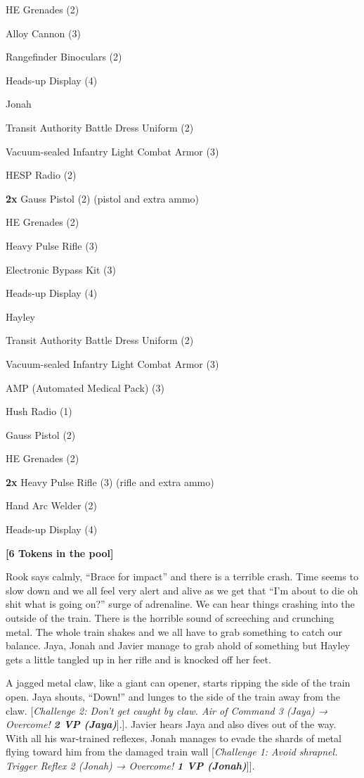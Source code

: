 HE Grenades (2)

Alloy Cannon (3)

Rangefinder Binoculars (2)

Heads-up Display (4)



Jonah

Transit Authority Battle Dress Uniform (2)

Vacuum-sealed Infantry Light Combat Armor (3)

HESP Radio (2)

\textbf{2x} Gauss Pistol (2) (pistol and extra ammo)

HE Grenades (2)

Heavy Pulse Rifle (3)

Electronic Bypass Kit (3)

Heads-up Display (4)



Hayley

Transit Authority Battle Dress Uniform (2)

Vacuum-sealed Infantry Light Combat Armor (3)

AMP (Automated Medical Pack) (3)

Hush Radio (1)

Gauss Pistol (2)

HE Grenades (2)

\textbf{2x} Heavy Pulse Rifle (3) (rifle and extra ammo)

Hand Arc Welder (2)

Heads-up Display (4)





\textbf{{[}6 Tokens in the pool{]}}



Rook says calmly, ``Brace for impact'' and there is a terrible crash.  Time seems to slow down and we all feel very alert and alive as we get that ``I'm about to die oh shit what is going on?'' surge of adrenaline.  We can hear things crashing into the outside of the train. There is the horrible sound of screeching and crunching metal. The whole train shakes and we all have to grab something to catch our balance.  Jaya, Jonah and Javier manage to grab ahold of something but Hayley gets a little tangled up in her rifle and is knocked off her feet.



A jagged metal claw, like a giant can opener, starts ripping the side of the train open.  Jaya shouts, ``Down!'' and lunges to the side of the train away from the claw.  {[}\textit{Challenge 2: Don't get caught by claw. Air of Command 3 (Jaya) → Overcome! }\textit{\textbf{2 VP (Jaya)}}{]}.{]}.  Javier hears Jaya and also dives out of the way.  With all his war-trained reflexes, Jonah manages to evade the shards of metal flying toward him from the damaged train wall {[}\textit{Challenge 1: Avoid shrapnel. Trigger Reflex 2 (Jonah) → Overcome! }\textit{\textbf{1 VP (Jonah)}}{]}{]}.



